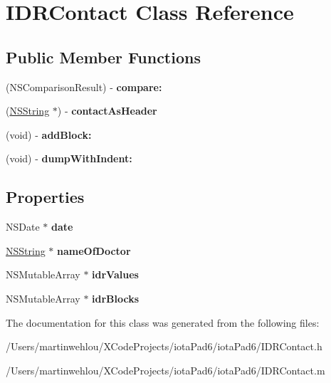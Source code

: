 \hypertarget{interface_i_d_r_contact}{
\section{IDRContact Class Reference}
\label{interface_i_d_r_contact}
}
\subsection*{Public Member Functions}
\begin{DoxyCompactItemize}
\item 
\hypertarget{interface_i_d_r_contact_a7c6ec9645f4892c3ed6058df575e98f7}{
(NSComparisonResult) -\/ {\bfseries compare:}}
\label{interface_i_d_r_contact_a7c6ec9645f4892c3ed6058df575e98f7}

\item 
\hypertarget{interface_i_d_r_contact_a49512ab42cb29d496bfa944b7f3a8a6d}{
(\hyperlink{class_n_s_string}{NSString} $\ast$) -\/ {\bfseries contactAsHeader}}
\label{interface_i_d_r_contact_a49512ab42cb29d496bfa944b7f3a8a6d}

\item 
\hypertarget{interface_i_d_r_contact_a50d0a435199768d5e63e7d81babd54e6}{
(void) -\/ {\bfseries addBlock:}}
\label{interface_i_d_r_contact_a50d0a435199768d5e63e7d81babd54e6}

\item 
\hypertarget{interface_i_d_r_contact_a28f35965b4d8281a8695a29ce2bfc692}{
(void) -\/ {\bfseries dumpWithIndent:}}
\label{interface_i_d_r_contact_a28f35965b4d8281a8695a29ce2bfc692}

\end{DoxyCompactItemize}
\subsection*{Properties}
\begin{DoxyCompactItemize}
\item 
\hypertarget{interface_i_d_r_contact_a896e0eb963d33963cfec01793896e65c}{
NSDate $\ast$ {\bfseries date}}
\label{interface_i_d_r_contact_a896e0eb963d33963cfec01793896e65c}

\item 
\hypertarget{interface_i_d_r_contact_a1077850a82c568ac75cbb0be0746a2e4}{
\hyperlink{class_n_s_string}{NSString} $\ast$ {\bfseries nameOfDoctor}}
\label{interface_i_d_r_contact_a1077850a82c568ac75cbb0be0746a2e4}

\item 
\hypertarget{interface_i_d_r_contact_acffe07f5cfd9d684f7ba99608e7b7100}{
NSMutableArray $\ast$ {\bfseries idrValues}}
\label{interface_i_d_r_contact_acffe07f5cfd9d684f7ba99608e7b7100}

\item 
\hypertarget{interface_i_d_r_contact_a772b21246eebc5b39569db8c1b8ed186}{
NSMutableArray $\ast$ {\bfseries idrBlocks}}
\label{interface_i_d_r_contact_a772b21246eebc5b39569db8c1b8ed186}

\end{DoxyCompactItemize}


The documentation for this class was generated from the following files:\begin{DoxyCompactItemize}
\item 
/Users/martinwehlou/XCodeProjects/iotaPad6/iotaPad6/IDRContact.h\item 
/Users/martinwehlou/XCodeProjects/iotaPad6/iotaPad6/IDRContact.m\end{DoxyCompactItemize}
